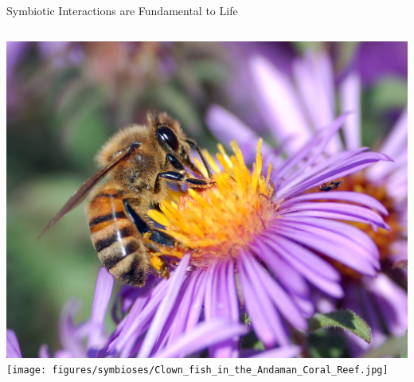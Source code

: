 \documentclass{beamer}
\begin{document}
\begin{frame}{Symbiotic Interactions are Fundamental to Life}
\begin{columns}
\begin{column}{0.444\textwidth}
\includegraphics[width=\textwidth]{figures/symbioses/European_honey_bee_extracts_nectar.jpg}
\vfil
\texttt{[image: figures/symbioses/Clown\_fish\_in\_the\_Andaman\_Coral\_Reef.jpg]}
\end{column}

\end{columns}

\end{frame}
\end{document}
